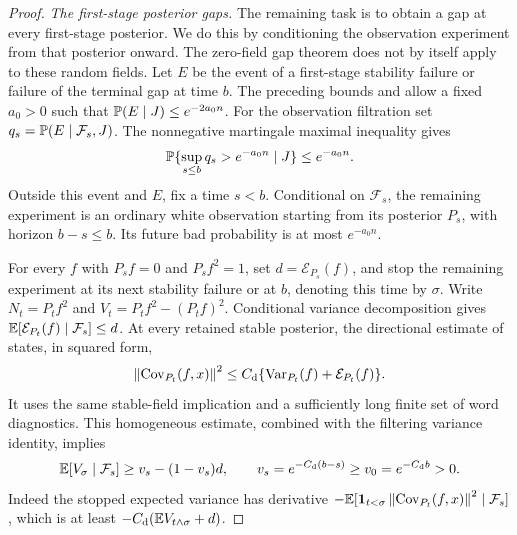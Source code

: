\begin{proof}
\emph{The first-stage posterior gaps.}
The remaining task is to obtain a gap at every first-stage posterior.
We do this by conditioning the observation experiment from that posterior
onward.  The zero-field gap theorem does not by itself apply to these
random fields.  Let $E$ be the event of a first-stage stability
failure or failure of the terminal gap at time $b$.  The preceding bounds
and \cite[Proposition~8.3]{SKGap} allow a fixed $a_0>0$ such that
$\P(E\mid J)\le e^{-2a_0 n}$.  For the observation filtration set
$q_s=\P(E\mid\mathcal F_s,J)$.  The nonnegative martingale maximal
inequality gives
\begin{equation}\label{eq:stat-future-bad}
 \P\{\sup_{s\le b}q_s>e^{-a_0n}\mid J\}\le e^{-a_0n}.
\end{equation}
Outside this event and $E$, fix a time $s<b$.  Conditional on
$\mathcal F_s$, the remaining experiment is an ordinary white
observation starting from its posterior $P_s$, with horizon $b-s\le b$.
Its future bad probability is at most $e^{-a_0n}$.

For every $f$ with $P_sf=0$ and $P_sf^2=1$, set
$d=\mathcal E_{P_s}(f)$, and stop the remaining experiment at its next
stability failure or at $b$, denoting this time by $\sigma$.  Write
$N_t=P_tf^2$ and $V_t=P_tf^2-(P_tf)^2$.
Conditional variance decomposition gives
$\E[\mathcal E_{P_t}(f)\mid\mathcal F_s]\le d$.
At every retained stable posterior, the directional estimate of
\cite[Proposition~7.2]{SKGap} states, in squared form,
\[
 \norm{\Cov_{P_t}(f,x)}^2
 \le C_{\rm d}\{\Var_{P_t}(f)+\mathcal E_{P_t}(f)\}.
\]
It uses the same stable-field implication and a sufficiently long finite
set of word diagnostics. This homogeneous estimate, combined with the
filtering variance identity, implies
\begin{equation}\label{eq:stat-conditional-variance}
 \E[V_\sigma\mid\mathcal F_s]
 \ge v_s-(1-v_s)d,
 \qquad v_s=e^{-C_{\rm d}(b-s)}\ge v_0=e^{-C_{\rm d}b}>0.
\end{equation}
Indeed the stopped expected variance has derivative
$-\E[\1_{t<\sigma}\norm{\Cov_{P_t}(f,x)}^2\mid\mathcal F_s]$,
which is at least $-C_{\rm d}(\E V_{t\wedge\sigma}+d)$.


\end{proof}
